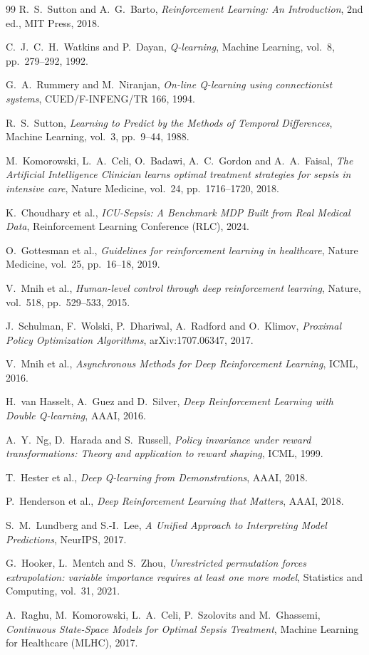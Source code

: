 \documentclass[11pt,a4paper]{article}
\begin{document}
\begin{thebibliography}{99}
R.~S.~Sutton and A.~G.~Barto,
\textit{Reinforcement Learning: An Introduction}, 2nd ed.,
MIT Press, 2018.

C.~J.~C.~H.~Watkins and P.~Dayan,
\textit{Q-learning},
Machine Learning, vol.~8, pp.~279--292, 1992.

G.~A.~Rummery and M.~Niranjan,
\textit{On-line Q-learning using connectionist systems},
CUED/F-INFENG/TR 166, 1994.

R.~S.~Sutton, \textit{Learning to Predict by the Methods of Temporal
Differences}, Machine Learning, vol.~3, pp.~9--44, 1988.

M.~Komorowski, L.~A.~Celi, O.~Badawi, A.~C.~Gordon and A.~A.~Faisal,
\textit{The Artificial Intelligence Clinician learns optimal treatment
strategies for sepsis in intensive care},
Nature Medicine, vol.~24, pp.~1716--1720, 2018.

K.~Choudhary et al.,
\textit{ICU-Sepsis: A Benchmark MDP Built from Real Medical Data},
Reinforcement Learning Conference (RLC), 2024.

O.~Gottesman et al.,
\textit{Guidelines for reinforcement learning in healthcare},
Nature Medicine, vol.~25, pp.~16--18, 2019.

V.~Mnih et al.,
\textit{Human-level control through deep reinforcement learning},
Nature, vol.~518, pp.~529--533, 2015.

J.~Schulman, F.~Wolski, P.~Dhariwal, A.~Radford and O.~Klimov,
\textit{Proximal Policy Optimization Algorithms}, arXiv:1707.06347, 2017.

V.~Mnih et al.,
\textit{Asynchronous Methods for Deep Reinforcement Learning}, ICML, 2016.

H.~van Hasselt, A.~Guez and D.~Silver,
\textit{Deep Reinforcement Learning with Double Q-learning}, AAAI, 2016.

A.~Y.~Ng, D.~Harada and S.~Russell,
\textit{Policy invariance under reward transformations: Theory and application
to reward shaping}, ICML, 1999.

T.~Hester et al.,
\textit{Deep Q-learning from Demonstrations}, AAAI, 2018.

P.~Henderson et al.,
\textit{Deep Reinforcement Learning that Matters}, AAAI, 2018.

S.~M.~Lundberg and S.-I.~Lee,
\textit{A Unified Approach to Interpreting Model Predictions}, NeurIPS, 2017.

G.~Hooker, L.~Mentch and S.~Zhou,
\textit{Unrestricted permutation forces extrapolation: variable importance
requires at least one more model}, Statistics and Computing, vol.~31, 2021.

A.~Raghu, M.~Komorowski, L.~A.~Celi, P.~Szolovits and M.~Ghassemi,
\textit{Continuous State-Space Models for Optimal Sepsis Treatment},
Machine Learning for Healthcare (MLHC), 2017.
\end{thebibliography}
\end{document}
